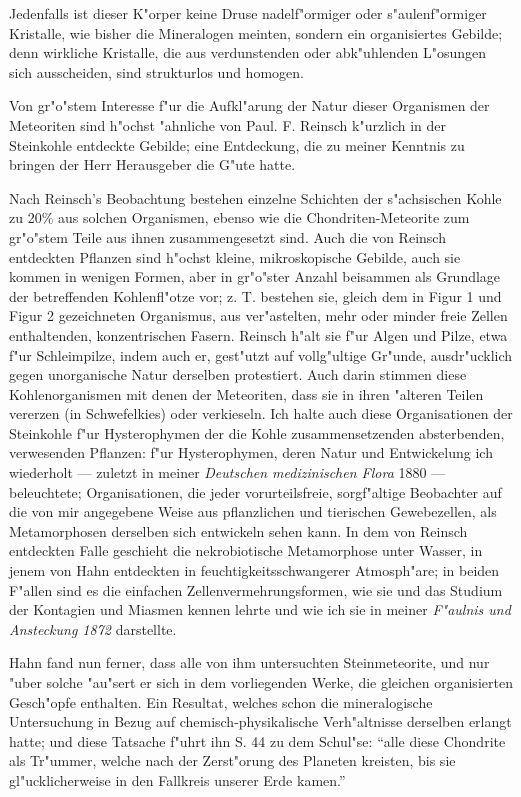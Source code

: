 \documentclass[a4paper, 11pt, oneside]{article}
\begin{document}
Jedenfalls ist dieser K"orper keine Druse nadelf"ormiger oder s"aulenf"ormiger Kristalle, wie bisher die Mineralogen meinten, sondern ein organisiertes Gebilde; denn wirkliche Kristalle, die aus verdunstenden oder abk"uhlenden L"osungen sich ausscheiden, sind strukturlos und homogen.

Von gr"o"stem Interesse f"ur die Aufkl"arung der Natur dieser Organismen der Meteoriten sind h"ochst "ahnliche von Paul. F. Reinsch k"urzlich in der Steinkohle entdeckte Gebilde; eine Entdeckung, die zu meiner Kenntnis zu bringen der Herr Herausgeber die G"ute hatte.

Nach Reinsch's Beobachtung bestehen einzelne Schichten der s"achsischen Kohle zu 20\% aus solchen Organismen, ebenso wie die Chondriten-Meteorite zum gr"o"stem Teile aus ihnen zusammengesetzt sind. Auch die von Reinsch entdeckten Pflanzen sind h"ochst kleine, mikroskopische Gebilde, auch sie kommen in wenigen Formen, aber in gr"o"ster Anzahl beisammen als Grundlage der betreffenden Kohlenfl"otze vor; z. T. bestehen sie, gleich dem in Figur 1 und Figur 2 gezeichneten Organismus, aus ver"astelten, mehr oder minder freie Zellen enthaltenden, konzentrischen Fasern. Reinsch h"alt sie f"ur Algen und Pilze, etwa f"ur Schleimpilze, indem auch er, gest"utzt auf vollg"ultige Gr"unde, ausdr"ucklich gegen unorganische Natur derselben protestiert. Auch darin stimmen diese Kohlenorganismen mit denen der Meteoriten, dass sie in ihren "alteren Teilen vererzen (in Schwefelkies) oder verkieseln. Ich halte auch diese Organisationen der Steinkohle f"ur Hysterophymen der die Kohle zusammensetzenden absterbenden, verwesenden Pflanzen: f"ur Hysterophymen, deren Natur und Entwickelung ich wiederholt --- zuletzt in meiner \emph{Deutschen medizinischen Flora} 1880 --- beleuchtete; Organisationen, die jeder vorurteilsfreie, sorgf"altige Beobachter auf die von mir angegebene Weise aus pflanzlichen und tierischen Gewebezellen, als Metamorphosen derselben sich entwickeln sehen kann. In dem von Reinsch entdeckten Falle geschieht die nekrobiotische Metamorphose unter Wasser, in jenem von Hahn entdeckten in feuchtigkeitsschwangerer Atmosph"are; in beiden F"allen sind es die einfachen Zellenvermehrungsformen, wie sie und das Studium der Kontagien und Miasmen kennen lehrte und wie ich sie in meiner \emph{F"aulnis und Ansteckung 1872} darstellte.

Hahn fand nun ferner, dass alle von ihm untersuchten Steinmeteorite, und nur "uber solche "au"sert er sich in dem vorliegenden Werke, die gleichen organisierten Gesch"opfe enthalten. Ein Resultat, welches schon die mineralogische Untersuchung in Bezug auf chemisch-physikalische Verh"altnisse derselben erlangt hatte; und diese Tatsache f"uhrt ihn S. 44 zu dem Schul"se: "`alle diese Chondrite als Tr"ummer, welche nach der Zerst"orung des Planeten kreisten, bis sie gl"ucklicherweise in den Fallkreis unserer Erde kamen."'
\end{document}
